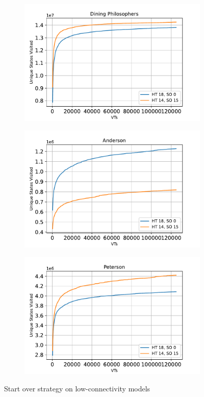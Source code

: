 \documentclass[
fancyheadings, %
%
%
]{stsreprt}
\begin{document}
\begin{figure}
    \begin{subfigure}[b]{.5\textwidth}
        \centering
        \includegraphics[width=\textwidth]{../evaluation/output-assets/EXP-13-start-overs-low-connectivity-1.pdf}
        \label{fig:evaluation:EXP-13:1}
    \end{subfigure}
    \begin{subfigure}[b]{.5\textwidth}
        \centering
        \includegraphics[width=\textwidth]{../evaluation/output-assets/EXP-13-start-overs-low-connectivity-2.pdf}
        \label{fig:evaluation:EXP-13:2}
    \end{subfigure}
    \begin{subfigure}[b]{\textwidth}
        \centering
        \includegraphics[width=.5\textwidth]{../evaluation/output-assets/EXP-13-start-overs-low-connectivity-3.pdf}
        \label{fig:evaluation:EXP-13:3}
    \end{subfigure}
    \caption{Start over strategy on low-connectivity models}
    \label{fig:evaluation:EXP-13}
\end{figure}
\end{document}
